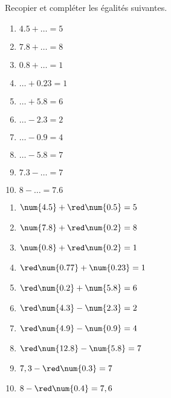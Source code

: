 \begin{exercice}
    Recopier et compléter les égalités suivantes.
    \begin{multicols}{2}
        \begin{spacing}{1.5}
            \begin{enumerate}
                \item $\num{4.5}+\dots =5$
                \item $\num{7.8}+\dots=8$
                \item $\num{0.8}+\dots=1$
                \item $\dots+\num{0.23}=1$
                \item $\dots+\num{5.8}=6$
                \item $\dots-\num{2.3} =2$
                \item $\dots-\num{0.9} =4$
                \item $\dots-\num{5.8} =7$
                \item $\num{7.3}-\dots =7$
                \item $8-\dots =\num{7.6}$
            \end{enumerate}
        \end{spacing}
    \end{multicols}
 \end{exercice}
 \begin{corrige}
    \phantom{rrr}
    \begin{multicols}{2}
        \begin{enumerate}
            \item $\num{4.5}+{\red \num{0.5}} =5$
            \item $\num{7.8}+{\red \num{0.2}}=8$
            \item $\num{0.8}+{\red \num{0.2}}=1$
            \item ${\red\num{0.77}}+\num{0.23}=1$
            \item ${\red\num{0.2}}+\num{5.8}=6$
            \item ${\red\num{4.3}}-\num{2.3} =2$
            \item ${\red\num{4.9}}-\num{0.9} =4$
            \item ${\red\num{12.8}}-\num{5.8} =7$
            \item $7,3-{\red\num{0.3}} =7$
            \item $8-  {\red\num{0.4}} =7,6$
        \end{enumerate}
    \end{multicols}
 \end{corrige}
